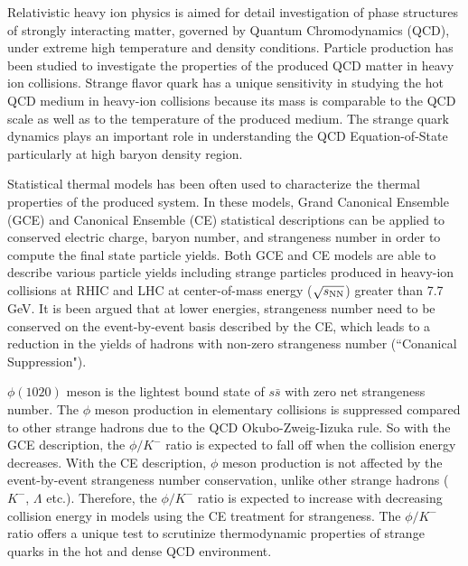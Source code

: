 \documentclass[%
 reprint,	
showpacs,
 amsmath,amssymb,
 aps,
 prc,
]{revtex4-1}
\begin{document}
\maketitle


Relativistic heavy ion physics is aimed for detail investigation of phase structures of strongly interacting matter, governed by Quantum Chromodynamics (QCD), under extreme high temperature and density conditions. Particle production has been studied to investigate the properties of the produced QCD matter in heavy ion collisions. Strange flavor quark has a unique sensitivity in studying the hot QCD medium in heavy-ion collisions because its mass is comparable to the QCD scale as well as to the temperature of the produced medium. The strange quark dynamics plays an important role in understanding the QCD Equation-of-State particularly at high baryon density region. 

Statistical thermal models has been often used to characterize the thermal properties of the produced system. In these models, Grand Canonical Ensemble (GCE) and Canonical Ensemble (CE) statistical descriptions can be applied to conserved electric charge, baryon number, and strangeness number in order to compute the final state particle yields. Both GCE and CE models are able to describe various particle yields including strange particles produced in heavy-ion collisions at RHIC and LHC at center-of-mass energy ($\sqrt{s_{\rm NN}}$) greater than 7.7\,GeV. It is been argued that at lower energies, strangeness number need to be conserved on the event-by-event basis described by the CE, which leads to a reduction in the yields of hadrons with non-zero strangeness number (``Conanical Suppression").

$\phi(1020)$ meson is the lightest bound state of $s\bar{s}$ with zero net strangeness number. The $\phi$ meson production in elementary collisions is suppressed compared to other strange hadrons due to the QCD Okubo-Zweig-Iizuka rule. So with the GCE description, the $\phi/K^-$ ratio is expected to fall off when the collision energy decreases. With the CE description, $\phi$ meson production is not affected by the event-by-event strangeness number conservation, unlike other strange hadrons ($K^-$, $\Lambda$ etc.). Therefore, the $\phi/K^-$ ratio is expected to increase with decreasing collision energy in models using the CE treatment for strangeness. The $\phi/K^-$ ratio offers a unique test to scrutinize thermodynamic properties of strange quarks in the hot and dense QCD environment.
\end{document}
